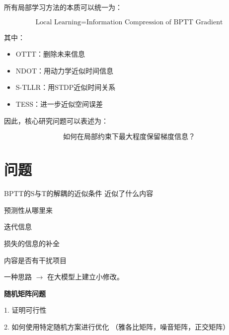 \documentclass[journal,12pt,onecolumn]{IEEEtran}
\begin{document}
所有局部学习方法的本质可以统一为：

\begin{equation}
\text{Local Learning} = \text{Information Compression of BPTT Gradient}
\end{equation}

其中：

\begin{itemize}
\item OTTT：删除未来信息
\item NDOT：用动力学近似时间信息
\item S-TLLR：用STDP近似时间关系
\item TESS：进一步近似空间误差
\end{itemize}

因此，核心研究问题可以表述为：

\begin{equation}
\text{如何在局部约束下最大程度保留梯度信息？}
\end{equation}


\section{问题}

BPTT的S与T的解耦的近似条件 近似了什么内容

预测性从哪里来

迭代信息

损失的信息的补全

内容是否有干扰项目



一种思路 $\rightarrow$ 在大模型上建立小修改。

\textbf{随机矩阵问题}

1. 证明可行性

2. 如何使用特定随机方案进行优化
（雅各比矩阵，噪音矩阵，正交矩阵）





\end{document}
